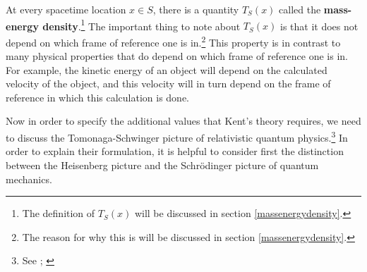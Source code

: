 At every spacetime location $x\in S$, there is a quantity $T_S(x)$ called the \label{massenergydensity}\textbf{mass-energy density}.\footnote{The definition of $T_S(x)$ will be discussed in section \ref{massenergydensity}.} The important thing to note about $T_S(x)$ is that it does not depend on which frame of reference one is in.\footnote{The reason for why this is will be discussed in section \ref{massenergydensity}.}
  This property is in contrast to many physical properties that do depend on which frame of reference one is in. For example, the kinetic energy of an object will depend on the calculated velocity of the object, and this velocity will in turn depend on the frame of reference in which this calculation is done. 
  
Now in order to specify the additional values that Kent's theory requires, we need to discuss the Tomonaga-Schwinger picture of relativistic quantum physics.\footnote{See \cite{SchwingerJulianI}; \cite{TomonagaI}} In order to explain their formulation, it is helpful to consider first the distinction between the Heisenberg picture and the Schr\"{o}dinger picture of quantum mechanics. 


